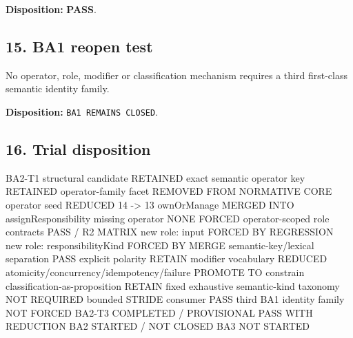 \documentclass[
  10pt,
  a4paper,
]{article}
\newenvironment{Shaded}{}{}
\newcommand{\NormalTok}[1]{#1}
\begin{document}
\textbf{Disposition:} \textbf{PASS}.

\subsection{15. BA1 reopen test}\label{15-ba1-reopen-test}

No operator, role, modifier or classification mechanism requires a third
first-class semantic identity family.

\textbf{Disposition:} \texttt{BA1\ REMAINS\ CLOSED}.

\subsection{16. Trial disposition}\label{16-trial-disposition}

\begin{Shaded}
\begin{Highlighting}[]
\NormalTok{BA2{-}T1 structural candidate                  RETAINED}
\NormalTok{exact semantic operator key                  RETAINED}
\NormalTok{operator{-}family facet                        REMOVED FROM NORMATIVE CORE}
\NormalTok{operator seed                                REDUCED 14 {-}\textgreater{} 13}
\NormalTok{ownOrManage                                  MERGED INTO assignResponsibility}
\NormalTok{missing operator                             NONE FORCED}
\NormalTok{operator{-}scoped role contracts               PASS / R2 MATRIX}
\NormalTok{new role: input                              FORCED BY REGRESSION}
\NormalTok{new role: responsibilityKind                 FORCED BY MERGE}
\NormalTok{semantic{-}key/lexical separation              PASS}
\NormalTok{explicit polarity                            RETAIN}
\NormalTok{modifier vocabulary                          REDUCED}
\NormalTok{atomicity/concurrency/idempotency/failure     PROMOTE TO constrain}
\NormalTok{classification{-}as{-}proposition                RETAIN}
\NormalTok{fixed exhaustive semantic{-}kind taxonomy      NOT REQUIRED}
\NormalTok{bounded STRIDE consumer                      PASS}
\NormalTok{third BA1 identity family                     NOT FORCED}
\NormalTok{BA2{-}T3                                        COMPLETED / PROVISIONAL PASS WITH REDUCTION}
\NormalTok{BA2                                           STARTED / NOT CLOSED}
\NormalTok{BA3                                           NOT STARTED}
\end{Highlighting}
\end{Shaded}
\end{document}
